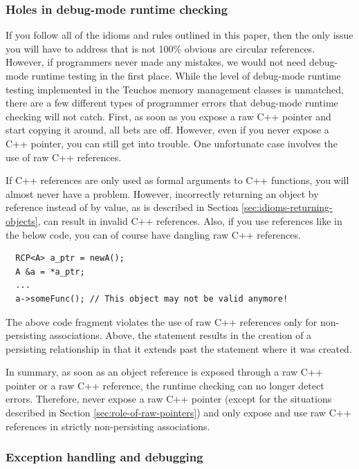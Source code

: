\documentclass[pdf,ps2pdf,11pt]{SANDreport}
\begin{document}
%
{}\subsubsection{Holes in debug-mode runtime checking}
%

If you follow all of the idioms and rules outlined in this paper, then
the only issue you will have to address that is not 100\% obvious are
circular references.  However, if programmers never made any mistakes,
we would not need debug-mode runtime testing in the first place.
While the level of debug-mode runtime testing implemented in the
Teuchos memory management classes is unmatched, there are a few
different types of programmer errors that debug-mode runtime checking
will not catch.  First, as soon as you expose a raw C++ pointer and
start copying it around, all bets are off.  However, even if you never
expose a C++ pointer, you can still get into trouble.  One unfortunate
case involves the use of raw C++ references.

If C++ references are only used as formal arguments to C++ functions,
you will almost never have a problem.  However, incorrectly returning
an {} object by reference instead of by value, as is
described in Section {}\ref{sec:idioms-returning-objects}, can result
in invalid C++ references.  Also, if you use references like in the
below code, you can of course have dangling raw C++ references.

{\small\begin{verbatim}
  RCP<A> a_ptr = newA();
  A &a = *a_ptr;
  ...
  a->someFunc(); // This object may not be valid anymore!
\end{verbatim}}

The above code fragment violates the use of raw C++ references only
for non-persisting associations.  Above, the statement {} results in the creation of a persisting relationship in that
it extends past the statement where it was created.

In summary, as soon as an object reference is exposed through a raw
C++ pointer or a raw C++ reference, the runtime checking can no longer
detect errors.  Therefore, never expose a raw C++ pointer (except for
the situations described in Section {}\ref{sec:role-of-raw-pointers})
and only expose and use raw C++ references in strictly non-persisting
associations.


%
{}\subsubsection{Exception handling and debugging}
\label{sec:except-handling-debugging}
%
\end{document}
